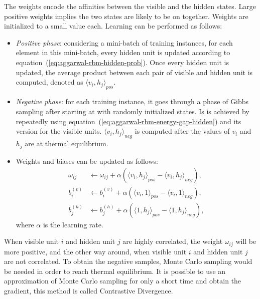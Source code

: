 The weights encode the affinities between the visible and the hidden states.
Large positive weights implies the two states are likely to be on together.
Weights are initialized to a small value each.
Learning can be performed as follows:
\begin{itemize}
    \item \textit{Positive phase}: considering a mini-batch of training instances, for each element in this mini-batch, every hidden unit is updated according to equation~(\ref{eq:aggarwal-rbm-hidden-prob}).
    Once every hidden unit is updated, the average product between each pair of visible and hidden unit is computed, denoted as ${\langle v_{i}, h_{j} \rangle}_{pos}$.
    
    \item \textit{Negative phase}: for each training instance, it goes through a phase of Gibbs sampling after starting at with randomly initialized states.
    Is is achieved by repeatedly using equation~(\ref{eq:aggarwal-rbm-energy-gap-hidden}) and its version for the visible units.
    ${\langle v_{i}, h_{j} \rangle}_{neg}$ is computed after the values of $v_{i}$ and $h_{j}$ are at thermal equilibrium.
    
    \item Weights and biases can be updated as follows:
    \begin{equation}
        \label{eq:aggarwal-weights-bias-update}
        \begin{split}
            \omega_{ij} &\leftarrow \omega_{ij} + \alpha ({\langle v_{i}, h_{j} \rangle}_{pos} - {\langle v_{i}, h_{j} \rangle}_{neg}), \\
            b^{(v)}_{i} &\leftarrow b^{(v)}_{i} + \alpha ({\langle v_{i}, 1 \rangle}_{pos} - {\langle v_{i}, 1 \rangle}_{neg}), \\
            b^{(h)}_{j} &\leftarrow  b^{(h)}_{j} + \alpha ({\langle 1, h_{j} \rangle}_{pos} - {\langle 1, h_{j} \rangle}_{neg}), 
        \end{split}
    \end{equation}
    where $\alpha$ is the learning rate.
\end{itemize}

When visible unit $i$ and hidden unit $j$ are highly correlated, the weight $\omega_{ij}$ will be more positive, and the other way around, when visible unit $i$ and hidden unit $j$ are not correlated.
To obtain the negative samples, Monte Carlo sampling would be needed in order to reach thermal equilibrium.
It is possible to use an approximation of Monte Carlo sampling for only a short time and obtain the gradient, this method is called Contrastive Divergence.



